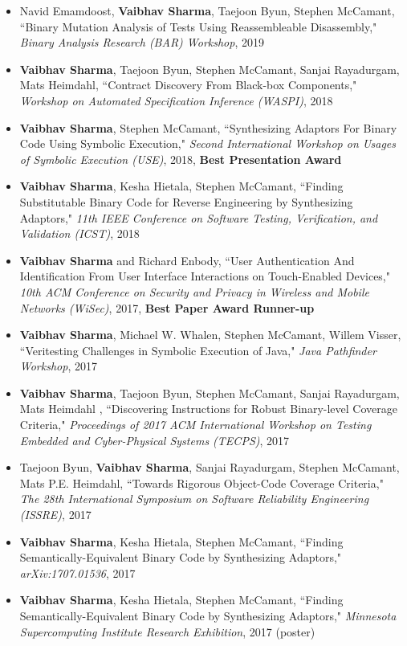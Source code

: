 \documentclass[letterpaper,10pt]{article}
\begin{document}
\begin{itemize}
\item
  Navid Emamdoost, {\bf Vaibhav Sharma}, Taejoon Byun, Stephen McCamant, ``Binary Mutation Analysis of Tests Using Reassembleable Disassembly," \textit{Binary Analysis Research (BAR) Workshop}, 2019
\item
  {\bf Vaibhav Sharma}, Taejoon Byun, Stephen McCamant, Sanjai Rayadurgam, Mats Heimdahl, ``Contract Discovery From Black-box Components," \textit{Workshop on Automated Specification Inference (WASPI)}, 2018
\item
  {\bf Vaibhav Sharma}, Stephen McCamant, ``Synthesizing Adaptors For Binary Code Using Symbolic Execution," \textit{Second International Workshop on Usages of Symbolic Execution (USE)}, 2018, {\bf Best Presentation Award}
\item
  {\bf Vaibhav Sharma}, Kesha Hietala, Stephen McCamant, ``Finding Substitutable Binary Code for Reverse Engineering by Synthesizing Adaptors," \textit{11th IEEE Conference on Software Testing, Verification, and Validation (ICST)}, 2018
\item
  {\bf Vaibhav Sharma} and Richard Enbody, ``User Authentication And Identification From User Interface Interactions on Touch-Enabled Devices," \textit{10th ACM Conference on Security and Privacy in Wireless and Mobile Networks (WiSec)}, 2017, {\bf Best Paper Award Runner-up}
\item
  {\bf Vaibhav Sharma}, Michael W. Whalen, Stephen McCamant, Willem Visser, ``Veritesting Challenges in Symbolic Execution of Java," \textit{Java Pathfinder Workshop}, 2017
\item
  {\bf Vaibhav Sharma}, Taejoon Byun, Stephen McCamant, Sanjai Rayadurgam, Mats Heimdahl , ``Discovering Instructions for Robust Binary-level Coverage Criteria," \textit{Proceedings of 2017 ACM International Workshop on Testing Embedded and Cyber-Physical Systems (TECPS)}, 2017
\item
  Taejoon Byun, {\bf Vaibhav Sharma}, Sanjai Rayadurgam, Stephen McCamant, Mats P.E. Heimdahl, ``Towards Rigorous Object-Code Coverage Criteria," \textit{The 28th International Symposium on Software Reliability Engineering (ISSRE)}, 2017
\item
  {\bf Vaibhav Sharma}, Kesha Hietala, Stephen McCamant, ``Finding Semantically-Equivalent Binary Code by Synthesizing Adaptors," \textit{arXiv:1707.01536}, 2017
\item
  {\bf Vaibhav Sharma}, Kesha Hietala, Stephen McCamant, ``Finding Semantically-Equivalent Binary Code by Synthesizing Adaptors," \textit{Minnesota Supercomputing Institute Research Exhibition}, 2017 (poster) 

\end{itemize}
\end{document}
